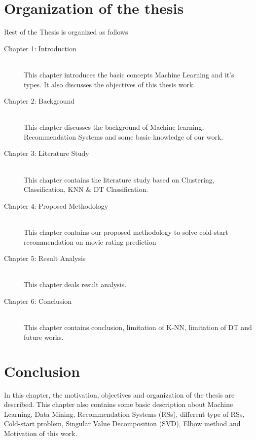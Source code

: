 \documentclass[document.tex]{subfiles}
\begin{document}

\section{Organization of the thesis}
Rest of the Thesis is organized as follows
\begin{description}
        \item[Chapter 1: Introduction] \hfill \\
        This chapter introduces the basic concepts Machine Learning and it's types. It also discusses the objectives of this thesis work.
        \item[Chapter 2: Background] \hfill \\
        This chapter discusses the background of Machine learning, Recommendation Systems and some basic knowledge of our work.
        \item[Chapter 3: Literature Study] \hfill \\
        This chapter contains the literature study based on Clustering, Classification, KNN \& DT Classification.
        \item[Chapter 4: Proposed Methodology] \hfill \\
        This chapter contains our proposed methodology to solve cold-start recommendation on movie rating prediction
        \item[Chapter 5: Result Analysis] \hfill \\
        This chapter deals result analysis.
        \item[Chapter 6: Conclusion] \hfill \\
        This chapter contains conclusion, limitation of K-NN, limitation of DT and future works.
\end{description}
\section{Conclusion}
In this chapter, the motivation, objectives and organization of the thesis are described. This chapter also contains some basic description about Machine Learning, Data Mining, Recommendation Systems (RSs), different type of RSs, Cold-start problem, Singular Value Decomposition (SVD), Elbow method and Motivation of this work.
\end{document}

